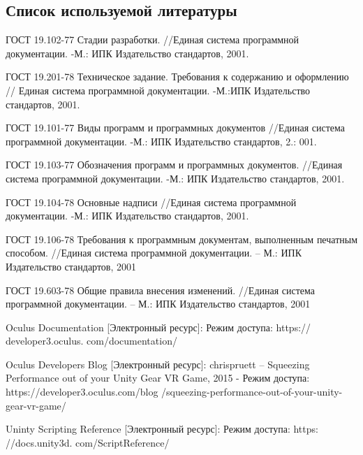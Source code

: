 \subsection{Список используемой литературы}
\begin{my_enumerate}
\item
ГОСТ 19.102-77 Стадии разработки. //Единая система программной документации. -М.: ИПК Издательство стандартов, 2001.

\item
ГОСТ 19.201-78 Техническое задание. Требования к содержанию и оформлению // Единая система программной документации. -М.:ИПК Издательство стандартов, 2001.

\item
ГОСТ 19.101-77 Виды программ и программных документов
//Единая система программной документации. -М.: ИПК Издательство стандартов, 2.: 001.

\item
ГОСТ 19.103-77 Обозначения программ и программных документов. //Единая система программной документации. -М.: ИПК Издательство стандартов, 2001.

\item
 ГОСТ 19.104-78 Основные надписи //Единая система программной документации. -М.: ИПК Издательство стандартов, 2001.

\item 
ГОСТ 19.106-78 Требования к программным документам, выполненным печатным способом. //Единая
система программной документации. – М.: ИПК Издательство стандартов, 2001

\item 
ГОСТ 19.603-78 Общие правила внесения изменений. //Единая система программной документации. –
М.: ИПК Издательство стандартов, 2001

\item
Oculus Documentation [Электронный ресурс]: Режим доступа: https:// developer3.oculus. com/documentation/

\item
Oculus Developers Blog [Электронный ресурс]: chrispruett – Squeezing Performance out of your Unity Gear VR Game, 2015 - Режим доступа: https://developer3.oculus.com/blog /squeezing-performance-out-of-your-unity-gear-vr-game/

\item 
Uninty Scripting Reference [Электронный ресурс]: Режим доступа: https: //docs.unity3d. com/ScriptReference/

\end{my_enumerate}

